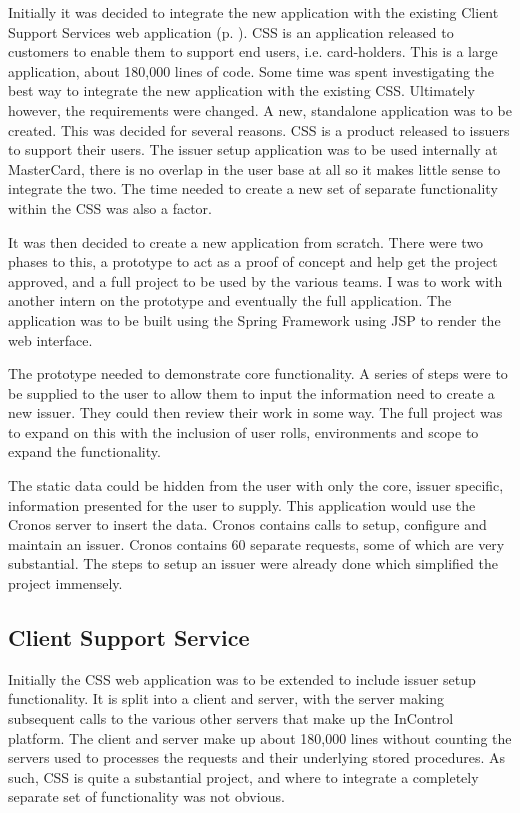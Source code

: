 \documentclass[a4paper, 11pt, titlepage]{article}
\begin{document}
Initially it was decided to integrate the new application with the existing Client Support Services web application (p. \pageref{CSS}). CSS is an application released to customers to enable them to support end users, i.e. card-holders. This is a large application, about 180,000 lines of code. Some time was spent investigating the best way to integrate the new application with the existing CSS. Ultimately however, the requirements were changed. A new, standalone application was to be created. This was decided for several reasons. CSS is a product released to issuers to support their users. The issuer setup application was to be used internally at MasterCard, there is no overlap in the user base at all so it makes little sense to integrate the two. The time needed to create a new set of separate functionality within the CSS was also a factor. 
 
It was then decided to create a new application from scratch. There were two phases to this, a prototype to act as a proof of concept and help get the project approved, and a full project to be used by the various teams. I was to work with another intern on the prototype and eventually the full application. The application was to be built using the Spring Framework using JSP to render the web interface. 
 
The prototype needed to demonstrate core functionality. A series of steps were to be supplied to the user to allow them to input the information need to create a new issuer. They could then review their work in some way. The full project was to expand on this with the inclusion of user rolls, environments and scope to expand the functionality.  

The static data could be hidden from the user with only the core, issuer specific, information presented for the user to supply. This application would use the Cronos server to insert the data. Cronos contains calls to setup, configure and maintain an issuer. Cronos contains 60 separate requests, some of which are very substantial. The steps to setup an issuer were already done which simplified the project immensely. 


\subsection{Client Support Service} 
\label{CSS}
 
Initially the CSS web application was to be extended to include issuer setup functionality. It is split into a client and server, with the server making subsequent calls to the various other servers that make up the InControl platform. The client and server make up about 180,000 lines without counting the servers used to processes the requests and their underlying stored procedures. As such, CSS is quite a substantial project, and where to integrate a completely separate set of functionality was not obvious.
\end{document}
